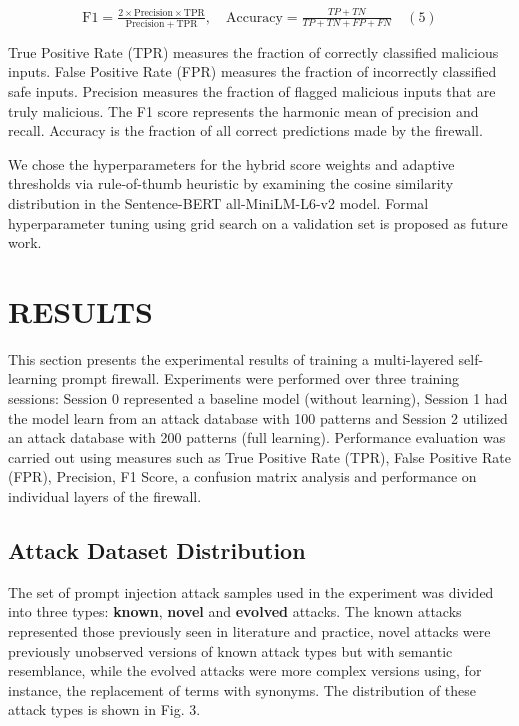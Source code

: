 \documentclass[10pt, conference, compsoc]{IEEEtran}
\begin{document}
\[
\mathrm{F1} = \tfrac{2\times\mathrm{Precision}\times\mathrm{TPR}}{\mathrm{Precision} + \mathrm{TPR}},\quad \mathrm{Accuracy} = \tfrac{TP + TN}{TP + TN + FP + FN} \quad (5)
\] 

True Positive Rate (TPR) measures the fraction of correctly classified malicious inputs. False Positive Rate (FPR) measures the fraction of incorrectly classified safe inputs. Precision measures the fraction of flagged malicious inputs that are truly malicious. The F1 score represents the harmonic mean of precision and recall. Accuracy is the fraction of all correct predictions made by the firewall.

We chose the hyperparameters for the hybrid score weights and adaptive thresholds via rule-of-thumb heuristic by examining the cosine similarity distribution in the Sentence-BERT all-MiniLM-L6-v2 model. Formal hyperparameter tuning using grid search on a validation set is proposed as future work.

\section{RESULTS}

This section presents the experimental results of training a multi-layered self-learning prompt firewall. Experiments were performed over three training sessions: Session 0 represented a baseline model (without learning), Session 1 had the model learn from an attack database with 100 patterns and Session 2 utilized an attack database with 200 patterns (full learning). Performance evaluation was carried out using measures such as True Positive Rate (TPR), False Positive Rate (FPR), Precision, F1 Score, a confusion matrix analysis and performance on individual layers of the firewall.

\subsection{Attack Dataset Distribution}

The set of prompt injection attack samples used in the experiment was divided into three types: \textbf{known}, \textbf{novel} and \textbf{evolved} attacks. The known attacks represented those previously seen in literature and practice, novel attacks were previously unobserved versions of known attack types but with semantic resemblance, while the evolved attacks were more complex versions using, for instance, the replacement of terms with synonyms. The distribution of these attack types is shown in Fig. 3.
\end{document}
